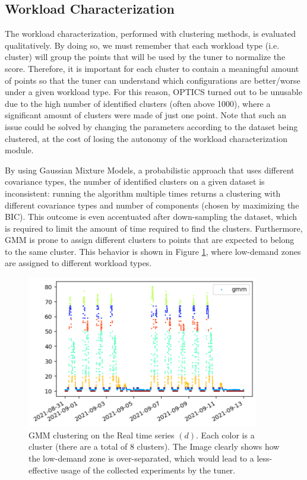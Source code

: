 \documentclass[a4paper, 12pt]{article} %
\begin{document}
	\subsection{Workload Characterization } \label{ssec:results_wkld_characterization}
	The workload characterization, performed with clustering methods, is evaluated qualitatively.
	By doing so, we must remember that each workload type (i.e. cluster) will group the points that will be used by the tuner to normalize the score. Therefore, it is important for each cluster to contain a meaningful amount of points so that the tuner can understand which configurations are better/worse under a given workload type. For this reason, OPTICS turned out to be unusable due to the high number of identified clusters (often above 1000), where a significant amount of clusters were made of just one point. Note that such an issue could be solved by changing the parameters according to the dataset being clustered, at the cost of losing the autonomy of the workload characterization module.  
	
	By using Gaussian Mixture Models, a probabilistic approach that uses different covariance types, the number of identified clusters on a given dataset is inconsistent: running the algorithm multiple times returns a clustering with different covariance types and number of components (chosen by maximizing the BIC). This outcome is even accentuated after down-sampling the dataset, which is required to limit the amount of time required to find the clusters. Furthermore, GMM is prone to assign different clusters to points that are expected to belong to the same cluster. This behavior is shown in Figure \ref{fig:results_gmm}, where low-demand zones are assigned to different workload types.
	
	\begin{figure} \centering
		\includegraphics[width=4in]{img/results_clustering_gmm.png}
		\caption{GMM clustering on the Real time series $(d)$. Each color is a cluster (there are a total of 8 clusters). The Image clearly shows how the low-demand zone is over-separated, which would lead to a less-effective usage of the collected experiments by the tuner.}
		\label{fig:results_gmm}
	\end{figure}
	
\end{document}
